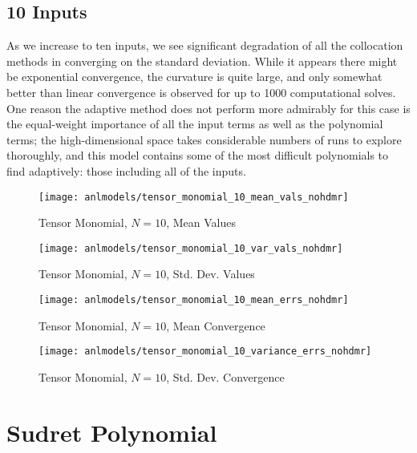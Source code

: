 \subsection{10 Inputs}
As we increase to ten inputs, we see significant degradation of all the collocation methods in converging on
the standard deviation.  While it appears there might be exponential convergence, the curvature is quite large, and
only somewhat better than linear convergence is observed for up to 1000 computational solves.  One reason the
adaptive method does not perform more admirably for this case is the equal-weight importance of all the input
terms as well as the polynomial terms; the high-dimensional space takes considerable numbers of runs to
explore thoroughly, and this model contains some of the most difficult polynomials to find adaptively: those including
all of the inputs. 
\begin{figure}[H]
  \centering
  \texttt{[image: anlmodels/tensor\_monomial\_10\_mean\_vals\_nohdmr]}
  \caption{Tensor Monomial, $N=10$, Mean Values}
  \label{fig:tensormono mean values 10}
\end{figure}
\begin{figure}[H]
  \centering
  \texttt{[image: anlmodels/tensor\_monomial\_10\_var\_vals\_nohdmr]}
  \caption{Tensor Monomial, $N=10$, Std. Dev. Values}
  \label{fig:tensormono var values 10}
\end{figure}

\begin{figure}[H]
  \centering
  \texttt{[image: anlmodels/tensor\_monomial\_10\_mean\_errs\_nohdmr]}
  \caption{Tensor Monomial, $N=10$, Mean Convergence}
  \label{fig:tensormono mean errors 10}
\end{figure}
\begin{figure}[H]
  \centering
  \texttt{[image: anlmodels/tensor\_monomial\_10\_variance\_errs\_nohdmr]}
  \caption{Tensor Monomial, $N=10$, Std. Dev. Convergence}
  \label{fig:tensormono var errors 10}
\end{figure}


\section{Sudret Polynomial}
